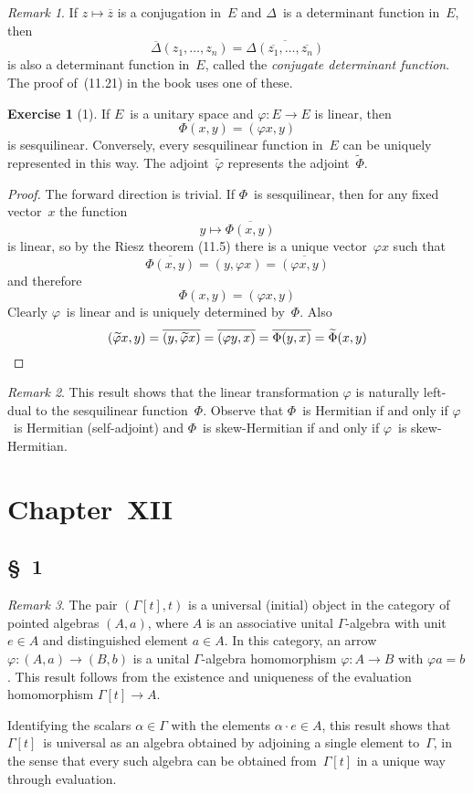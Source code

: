 \documentclass[letterpaper,12pt]{article}
\newcommand{\mult}{\cdot}
\newcommand{\iprod}[2]{(#1,#2)}
\newcommand{\adj}[1]{\widetilde{#1}}
\newcommand{\conj}[1]{\overline{#1}}
\theoremstyle{definition}
\newtheorem*{exer}{Exercise}
\theoremstyle{remark}
\newtheorem*{rmk}{Remark}
\begin{document}
\begin{rmk}
If \(z\mapsto\conj{z}\) is a conjugation in~\(E\) and \(\Delta\)~is a determinant function in~\(E\), then
\[\conj{\Delta}(z_1,\ldots,z_n)=\conj{\Delta(\conj{z_1},\ldots,\conj{z_n})}\]
is also a determinant function in~\(E\), called the \emph{conjugate determinant function}. The proof of~(11.21) in the book uses one of these.
\end{rmk}

\begin{exer}[1]
If \(E\)~is a unitary space and \(\varphi:E\to E\) is linear, then
\[\Phi(x,y)=\iprod{\varphi x}{y}\]
is sesquilinear. Conversely, every sesquilinear function in~\(E\) can be uniquely represented in this way. The adjoint~\(\adj{\varphi}\) represents the adjoint~\(\adj{\Phi}\).
\end{exer}
\begin{proof}
The forward direction is trivial. If \(\Phi\)~is sesquilinear, then for any fixed vector~\(x\) the function
\[y\mapsto\conj{\Phi(x,y)}\]
is linear, so by the Riesz theorem (11.5) there is a unique vector~\(\varphi x\) such that
\[\conj{\Phi(x,y)}=\iprod{y}{\varphi x}=\conj{\iprod{\varphi x}{y}}\]
and therefore
\[\Phi(x,y)=\iprod{\varphi x}{y}\]
Clearly \(\varphi\)~is linear and is uniquely determined by~\(\Phi\). Also
\[\iprod{\adj{\varphi}x}{y}=\conj{\iprod{y}{\adj{\varphi}x}}=\conj{\iprod{\varphi y}{x}}=\conj{\Phi(y,x)}=\adj{\Phi}(x,y)\qedhere\]
\end{proof}
\begin{rmk}
This result shows that the linear transformation \(\varphi\) is naturally left-dual to the sesquilinear function~\(\Phi\). Observe that \(\Phi\)~is Hermitian if and only if \(\varphi\)~is Hermitian (self-adjoint) and \(\Phi\)~is skew-Hermitian if and only if \(\varphi\)~is skew-Hermitian.
\end{rmk}

\newpage
\section*{Chapter~XII}
\subsection*{\S~1}
\begin{rmk}
The pair \((\Gamma[t], t)\) is a universal (initial) object in the category of pointed algebras \((A,a)\), where \(A\) is an associative unital \(\Gamma\)-algebra with unit \(e\in A\) and distinguished element \(a\in A\). In this category, an arrow \(\varphi:(A,a)\to(B,b)\) is a unital \(\Gamma\)-algebra homomorphism \(\varphi:A\to B\) with \(\varphi a=b\). This result follows from the existence and uniqueness of the evaluation homomorphism \(\Gamma[t]\to A\).

Identifying the scalars \(\alpha\in\Gamma\) with the elements \(\alpha\mult e\in A\), this result shows that \(\Gamma[t]\)~is universal as an algebra obtained by adjoining a single element to~\(\Gamma\), in the sense that every such algebra can be obtained from~\(\Gamma[t]\) in a unique way through evaluation.
\end{rmk}
\end{document}
